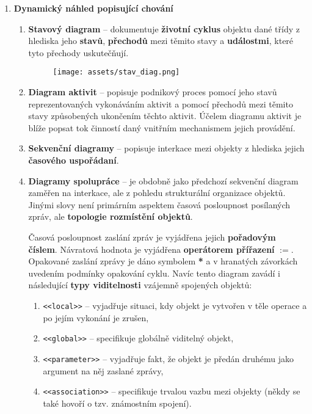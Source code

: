 \begin{enumerate}
    \item \textbf{Dynamický náhled popisující chování}
          \begin{enumerate}
              \item \textbf{Stavový diagram} -- dokumentuje \textbf{životní cyklus} objektu dané třídy z hlediska jeho \textbf{stavů}, \textbf{přechodů} mezi těmito stavy a \textbf{událostmi}, které tyto přechody uskutečňují.
                    \begin{figure}[H]
                        \centering
                        \texttt{[image: assets/stav\_diag.png]}
                    \end{figure}
              \item \textbf{Diagram aktivit} --  popisuje podnikový proces pomocí jeho stavů reprezentovaných vykonáváním aktivit a pomocí přechodů mezi těmito stavy způsobených ukončením těchto aktivit. Účelem diagramu aktivit je blíže popsat tok činností daný vnitřním mechanismem jejich provádění.
              \item \textbf{Sekvenční diagramy} -- popisuje interkace mezi objekty z hlediska jejich \textbf{časového uspořádaní}.
              \item \textbf{Diagramy spolupráce} -- je obdobně jako předchozí sekvenční diagram zaměřen na interkace, ale z pohledu strukturální organizace objektů. Jinými slovy není primárním aspektem časová posloupnost posílaných zpráv, ale \textbf{topologie rozmístění objektů}.

                    Časová posloupnost zaslání zpráv je vyjádřena jejich \textbf{pořadovým číslem}. Návratová hodnota je vyjádřena \textbf{operátorem přířazení} \textbf{$:=$}. Opakované zaslání zprávy je dáno symbolem \textbf{*} a v hranatých závorkách uvedením podmínky opakování cyklu. Navíc tento diagram zavádí i následující \textbf{typy viditelnosti} vzájemně spojených objektů:
                    \begin{enumerate}
                        \item \texttt{<<local>>} -- vyjadřuje situaci, kdy objekt je vytvořen v těle operace a po jejím vykonání je zrušen,
                        \item \texttt{<<global>>} -- specifikuje globálně viditelný objekt,
                        \item \texttt{<<parameter>>} -- vyjadřuje fakt, že objekt je předán druhému jako argument na něj zaslané zprávy,
                        \item \texttt{<<association>>} -- specifikuje trvalou vazbu mezi objekty (někdy se také hovoří o tzv. známostním spojení).
                    \end{enumerate}


\end{enumerate}
\end{enumerate}
